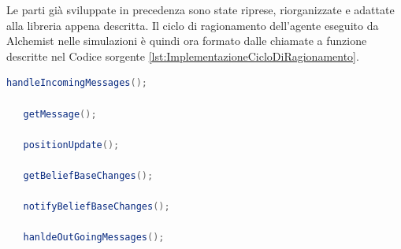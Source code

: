 \documentclass[12pt,a4paper,openright,twoside]{report}
\begin{document}
\bigskip

Le parti gi\`a sviluppate in precedenza sono state riprese, riorganizzate e adattate alla libreria appena descritta.
Il ciclo di ragionamento dell'agente eseguito da Alchemist nelle simulazioni \`e quindi ora formato dalle chiamate a funzione descritte nel Codice sorgente \ref{lst:ImplementazioneCicloDiRagionamento}.
\medskip
\begin{lstlisting}[language=Java,firstnumber=1,label={lst:ImplementazioneCicloDiRagionamento},caption={Implementazione ciclo di ragionamento}]
   handleIncomingMessages();

   getMessage();

   positionUpdate();

   getBeliefBaseChanges();

   notifyBeliefBaseChanges();

   hanldeOutGoingMessages();
\end{lstlisting}
\end{document}
